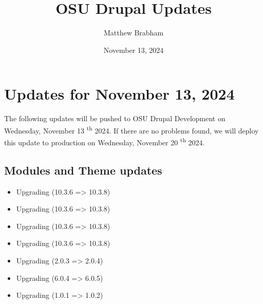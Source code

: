 
\title{OSU Drupal Updates}
\author{Matthew Brabham}
\date{November 13, 2024}

    \maketitle
    \tableofcontents


    \section{Updates for November 13, 2024}
    The following updates will be pushed to OSU Drupal Development on Wednesday, November 13 \textsuperscript{th} 2024.
    If there are no problems found, we will deploy this update to production on Wednesday, November 20 \textsuperscript{th} 2024.

    \subsection{Modules and Theme updates}

    \begin{itemize}
        \item Upgrading  (10.3.6 => 10.3.8)
        \item Upgrading  (10.3.6 => 10.3.8)
        \item Upgrading  (10.3.6 => 10.3.8)
        \item Upgrading  (10.3.6 => 10.3.8)
        \item Upgrading  (2.0.3 => 2.0.4)
        \item Upgrading  (6.0.4 => 6.0.5)
        \item Upgrading  (1.0.1 => 1.0.2)
    \end{itemize}

